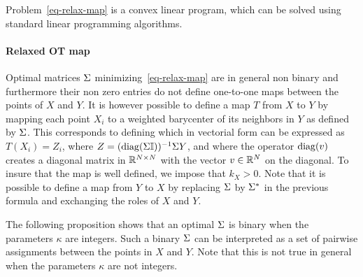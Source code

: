   
Problem~\eqref{eq-relax-map} is  a convex linear program, which can be solved using standard linear programming algorithms. 

\paragraph{Relaxed OT map} Optimal matrices $\Sigma$ minimizing~\eqref{eq-relax-map} are in general non binary and furthermore their non zero entries do not define one-to-one maps between the points of $X$ and $Y$. It is however possible to define a map $T$ from $X$ to $Y$ by mapping each point $X_i$ to a weighted barycenter of its neighbors in $Y$ as defined by $\Sigma$. This corresponds to defining
 which in vectorial form can be expressed as $T(X_i)= Z_i $, where $Z=(\diag(\Sig \U))^{-1} \Sig Y$, and where the operator $\diag(v)$ creates a diagonal matrix in $\mathbb{R}^{N \times N}$ with the vector $v \in \mathbb{R}^N$ on the diagonal.
To insure that the map is well defined, we impose that $k_X > 0$.  Note that it is possible to define a map from $Y$ to $X$ by replacing $\Sigma$ by $\Sigma^*$ in the previous formula and exchanging the roles of $X$ and $Y$.
 
The following proposition shows that an optimal $\Sigma$ is binary when the parameters $\kappa$ are integers. Such a binary $\Sigma$ can be interpreted as a set of pairwise assignments between the points in $X$ and $Y$. Note that this is not true in general when the parameters $\kappa$ are not integers.

